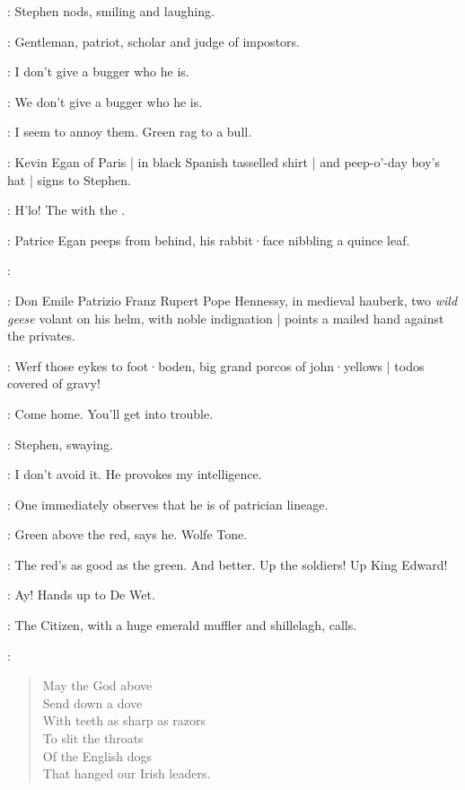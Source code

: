 :
Stephen nods,
smiling and laughing.

\Stephen:
Gentleman,
patriot,
scholar and judge of impostors.

\Carr:
I don't give a bugger who he is.

\Compton:
We don't give a bugger who he is.

\Stephen:
I seem to annoy them.
Green rag to a bull.

:
Kevin Egan of Paris |
in black Spanish tasselled shirt |
and peep-o'-day boy's hat |
signs to Stephen.

\KevinEgan:
H'lo!
The  with the .

:
Patrice Egan peeps from behind,
his rabbit·face nibbling a quince leaf.

\Patrice:

:
Don Emile Patrizio Franz Rupert Pope Hennessy,
in medieval hauberk,
two \emph{wild geese} volant on his helm,
with noble indignation |
points a mailed hand against the privates.

\DonEmile:
Werf those eykes to foot·boden,
big grand porcos of john·yellows |
todos covered of gravy!

\Bloom:
Come home.
You'll get into trouble.

:
Stephen,
swaying.

\Stephen:
I don't avoid it.
He provokes my intelligence.

\BiddyClap[7b]:
One immediately observes that he is of patrician lineage.

\Virago[7b]:
Green above the red,
says he.
Wolfe Tone.

\Bawd[7b]:
The red's as good as the green.
And better.
Up the soldiers!
Up King Edward!%

\ARough[7b]:
Ay!
Hands up to De Wet.

:
The Citizen,
with a huge emerald muffler and shillelagh,
calls.

\Citizen:
\begin{verse}
    May the God above\\
    Send down a dove\\
    With teeth as sharp as razors\\
    To slit the throats\\
    Of the English dogs\\
%
    That hanged our Irish leaders.
\end{verse}

